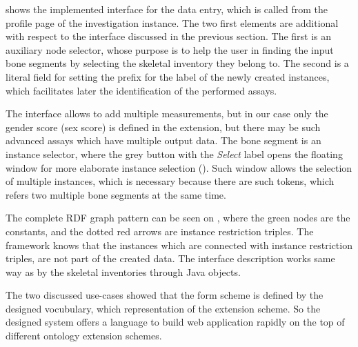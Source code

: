 
 shows the implemented interface for the data entry, which is called from the profile page of the investigation instance. The two first elements are additional with respect to the interface discussed in the previous section. The first is an auxiliary node selector, whose purpose is to help the user in finding the input bone segments by selecting the skeletal inventory they belong to. The second is a literal field for setting the prefix for the label of the newly created instances, which facilitates later the identification of the performed assays.


The interface allows to add multiple measurements, but in our case only the gender score (sex score) is defined in the extension, but there may be such advanced assays which have multiple output data. The bone segment is an instance selector, where the grey button with the \textit{Select} label opens the floating window for more elaborate instance selection (). Such window allows the selection of multiple instances, which is necessary because there are such tokens, which refers two multiple bone segments at the same time.


The complete RDF graph pattern can be seen on , where the green nodes are the constants, and the dotted red arrows are instance restriction triples. The framework knows that the instances which are connected with instance restriction triples, are not part of the created data. The interface description works same way as by the skeletal inventories through Java objects.


The two discussed use-cases showed that the form scheme is defined by the designed vocubulary, which representation of the extension scheme. So the designed system offers a language to build web application rapidly on the top of different ontology extension schemes.


